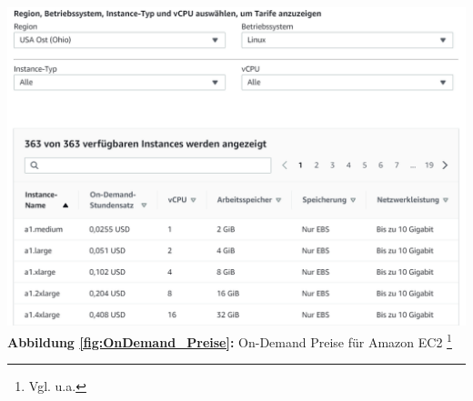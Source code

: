 \begin{center}
      \includegraphics[scale=0.4]{sources/On-Demand-Pläne für Amazon EC2}\label{fig:OnDemand_Preise}\\
      \textbf{Abbildung \autoref{fig:OnDemand_Preise}:} On-Demand Preise für Amazon EC2
      \footnote{Vgl. u.a.\cite{AMZ01}}
  \end{center}

